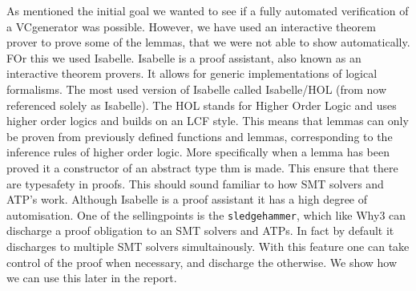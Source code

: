 As mentioned the initial goal we wanted to see if a fully automated verification of a VCgenerator was possible.
However, we have used an interactive theorem prover to prove some of the lemmas, that we were not able to show automatically.
FOr this we used Isabelle.
Isabelle is a proof assistant, also known as an interactive theorem provers.
It allows for generic implementations of logical formalisms.
The most used version of Isabelle called Isabelle/HOL (from now referenced solely as Isabelle).
The HOL stands for Higher Order Logic and uses higher order logics and builds on an LCF style.
This means that lemmas can only be proven from previously defined functions and lemmas, corresponding to the inference rules of higher order logic. More specifically when a lemma has been proved it a constructor of an abstract type thm is made. This ensure that there are typesafety in proofs.
This should sound familiar to how SMT solvers and ATP's work.
Although Isabelle is a proof assistant it has a high degree of automisation.
One of the sellingpoints is the \texttt{sledgehammer},
which like Why3 can discharge a proof obligation to an SMT solvers and ATPs.
In fact by default it discharges to multiple SMT solvers simultainously.
With this feature one can take control of the proof when necessary, and discharge
the otherwise.
We show how we can use this later in the report.
